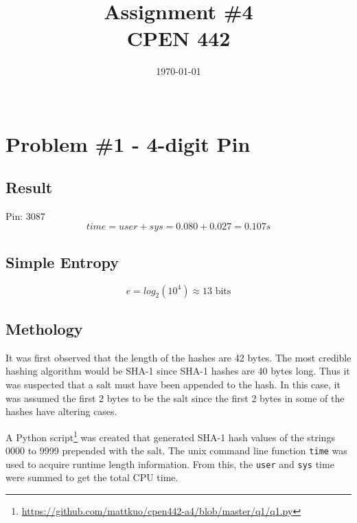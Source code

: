 \documentclass[conference]{IEEEtran}
\begin{document}
\title{Assignment \#4\\
\Large{CPEN 442\\}}


\author{
  \today\\\\
}


\maketitle


\section{Problem \#1 - 4-digit Pin}

\subsection{Result}
  \noindent Pin: 3087
  \begin{displaymath}
  time = user + sys = 0.080 + 0.027 = 0.107s
  \end{displaymath}

\subsection{Simple Entropy}
  \begin{displaymath}
    e = log_2(10^4) \approx 13 \mbox{ bits}
  \end{displaymath}

\subsection{Methology}
It was first observed that the length of the hashes are 42 bytes. The most
credible hashing algorithm would be SHA-1 since SHA-1 hashes are 40 bytes long.
Thus it was suspected that a salt must have been appended to the hash. In this
case, it was assumed the first 2 bytes to be the salt since the first 2 bytes in
some of the hashes have altering cases.

A Python
script\footnote{\url{https://github.com/mattkuo/cpen442-a4/blob/master/q1/q1.py}}
was created that generated SHA-1 hash values of the strings 0000 to 9999
prepended with the salt. The unix command line function \texttt{time} was used
to acquire runtime length information. From this, the \texttt{user} and
\texttt{sys} time were summed to get the total CPU time.
\end{document}
